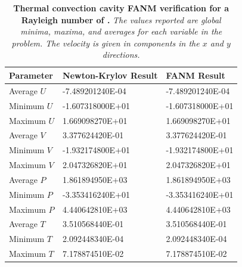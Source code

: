 \begin{table}[h!]
  \begin{center}
    \begin{tabular}{lll}\hline\hline
      \multicolumn{1}{l}{Parameter}& 
      \multicolumn{1}{l}{Newton-Krylov Result}&
      \multicolumn{1}{l}{FANM Result}\\
      \hline
      Average $U$ & -7.489201240E-04 & -7.489201240E-04 \\
      Minimum $U$ & -1.607318000E+01 & -1.607318000E+01 \\
      Maximum $U$ & 1.669098270E+01 & 1.669098270E+01 \\
      \hline
      Average $V$ & 3.377624420E-01 & 3.377624420E-01 \\
      Minimum $V$ & -1.932174800E+01 & -1.932174800E+01 \\
      Maximum $V$ & 2.047326820E+01 & 2.047326820E+01 \\
      \hline
      Average $P$ & 1.861894950E+03 & 1.861894950E+03 \\
      Minimum $P$ & -3.353416240E+01 & -3.353416240E+01 \\
      Maximum $P$ & 4.440642810E+03 & 4.440642810E+03 \\
      \hline
      Average $T$ & 3.510568440E-01 & 3.510568440E-01 \\
      Minimum $T$ & 2.092448340E-04 & 2.092448340E-04 \\
      Maximum $T$ & 7.178874510E-02 & 7.178874510E-02 \\
      \hline\hline
    \end{tabular}
  \end{center}
  \caption{\textbf{Thermal convection cavity FANM verification for a
      Rayleigh number of .} \textit{The values reported are
      global minima, maxima, and averages for each variable in the
      problem. The velocity is given in components in the $x$ and $y$
      directions.}}
  \label{tab:convection_ra1e4_results}
\end{table}

